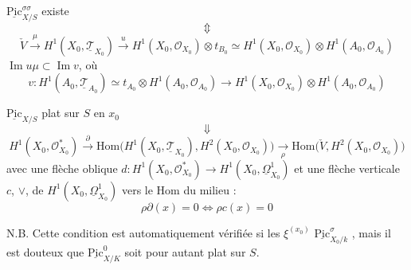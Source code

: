 \documentclass[11pt,a4paper]{article}
\begin{document}
$\underline{\mathrm{Pic}}^{\sigma\sigma}_{X/S}$ existe
\[
\Updownarrow
\]
\[
\check V \xrightarrow{\ \mu\ } H^1(X_0, \underline{\mathcal{T}}_{X_0}) \xrightarrow{\ u\ } H^1(X_0, \mathcal{O}_{X_0}) \otimes t_{B_0} \simeq H^1(X_0, \mathcal{O}_{X_0}) \otimes H^1(A_0, \mathcal{O}_{A_0})
\]
$\operatorname{Im} u\mu \subset \operatorname{Im} v$, où
\[
v : H^1(A_0, \underline{\mathcal{T}}_{A_0}) \simeq t_{A_0} \otimes H^1(A_0, \mathcal{O}_{A_0}) \to H^1(X_0, \mathcal{O}_{X_0}) \otimes H^1(A_0, \mathcal{O}_{A_0})
\]

$\underline{\mathrm{Pic}}_{X/S}$ plat sur $S$ en $x_0$
\[
\Downarrow
\]
\[
H^1(X_0, \mathcal{O}^*_{X_0}) \xrightarrow{\ \partial\ } \mathrm{Hom}\bigl(H^1(X_0, \underline{\mathcal{T}}_{X_0}), H^2(X_0, \mathcal{O}_{X_0})\bigr) \xrightarrow[\ \rho\ ]{} \mathrm{Hom}\bigl(\check V, H^2(X_0, \mathcal{O}_{X_0})\bigr)
\]
avec une flèche oblique $d : H^1(X_0, \mathcal{O}^*_{X_0}) \to H^1(X_0, \underline{\Omega}^1_{X_0})$ et une flèche verticale $c$,  $\vee$, de $H^1(X_0, \underline{\Omega}^1_{X_0})$ vers le $\mathrm{Hom}$ du milieu :
\[
\rho\partial(x) = 0 \iff \rho c(x) = 0
\]

N.B. Cette condition est automatiquement vérifiée si les $\xi^{(x_0)}$ \ill{} \ill{} $\underline{\mathrm{Pic}}^{\sigma}_{X_0/k}$ \struck{\ill{}}, mais il est douteux que $\underline{\mathrm{Pic}}^0_{X/K}$ soit pour autant plat sur $S$.
\end{document}
